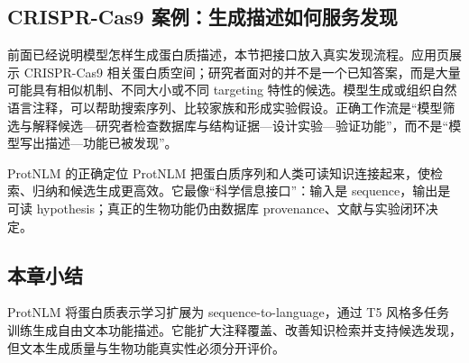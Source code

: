 \subsection{CRISPR-Cas9 案例：生成描述如何服务发现}

前面已经说明模型怎样生成蛋白质描述，本节把接口放入真实发现流程。应用页展示 CRISPR-Cas9 相关蛋白质空间；研究者面对的并不是一个已知答案，而是大量可能具有相似机制、不同大小或不同 targeting 特性的候选。模型生成或组织自然语言注释，可以帮助搜索序列、比较家族和形成实验假设。正确工作流是“模型筛选与解释候选—研究者检查数据库与结构证据—设计实验—验证功能”，而不是“模型写出描述—功能已被发现”。



\begin{importantbox}{ProtNLM 的正确定位}
ProtNLM 把蛋白质序列和人类可读知识连接起来，使检索、归纳和候选生成更高效。它最像“科学信息接口”：输入是 sequence，输出是可读 hypothesis；真正的生物功能仍由数据库 provenance、文献与实验闭环决定。
\end{importantbox}

\subsection{本章小结}

ProtNLM 将蛋白质表示学习扩展为 sequence-to-language，通过 T5 风格多任务训练生成自由文本功能描述。它能扩大注释覆盖、改善知识检索并支持候选发现，但文本生成质量与生物功能真实性必须分开评价。

